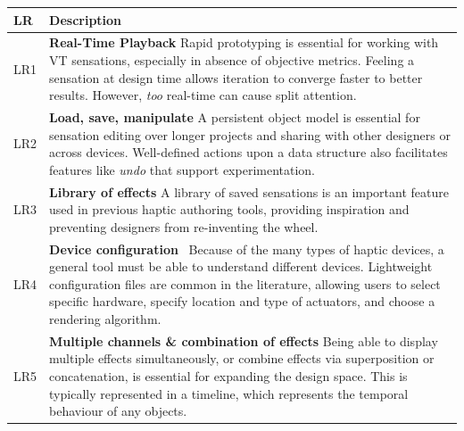 \begin{table}
	\begin{tabular}{|l|p{}|}
	\hline
	\rowcolor{tableheadercolor}

	\textbf{LR}
		& \textbf{Description} \\
	\hline
		LR1 
		 &
		 \textbf{Real-Time Playback} \cite{Moussette2011,Schneider2014}
		 Rapid prototyping is essential for working with VT sensations, especially in absence of objective metrics. %
		 Feeling a sensation at design time allows iteration to converge faster to better results. %
		 However, \textit{too} real-time can cause split attention.
	\\
	\hline
		LR2 & 
		 \textbf{Load, save, manipulate}
		 \cite{Resnick2008,Johnson2002,Schneider2014}
		 	A persistent object model is essential for sensation editing over %
			longer projects and %
			sharing with other designers or across devices.
			Well-defined actions upon a data structure also facilitates features like \textit{undo} that support experimentation.
	\\
	\hline
		LR3 &
		\textbf{Library of effects} \cite{Enriquez2003,Swindells2006,Herring2009,Paneels2013,Swindells2014}
			 A library of saved sensations is an important feature used in previous haptic authoring tools, providing inspiration and preventing designers from re-inventing the wheel.
	\\
	\hline
		LR4 &
		\textbf{Device configuration} \cite{Kim2009,Paneels2013,Lee2012,Lee2013}%
			~Because of the many types of haptic devices, a general tool must be able to understand different devices.
			Lightweight configuration files are common in the literature, allowing users to select specific hardware, specify location and type of actuators, and choose a rendering algorithm.
	\\
	\hline
		LR5 &
		\textbf{Multiple channels \& combination of effects}
		 \cite{Enriquez2003,Swindells2006,Ryu2008,Paneels2013,Swindells2014}	 
		 Being able to display multiple effects simultaneously, or combine effects via superposition or concatenation, is essential for expanding the design space.
		 This is typically represented in a timeline, which represents the temporal behaviour of any objects.
	\\
	\hline

\end{tabular}
\end{table}
